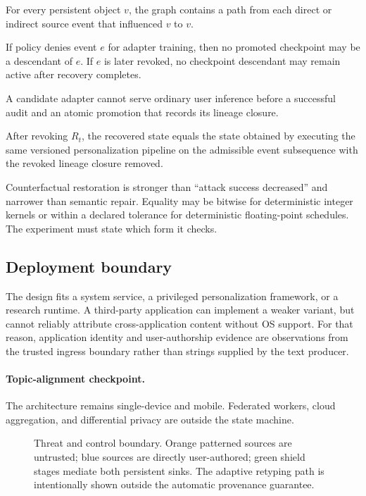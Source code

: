 \begin{definition}
For every persistent object $v$, the graph contains a path from each direct or indirect source event that influenced $v$ to $v$.
\end{definition}

\begin{definition}
If policy denies event $e$ for adapter training, then no promoted checkpoint may be a descendant of $e$. If $e$ is later revoked, no checkpoint descendant may remain active after recovery completes.
\end{definition}

\begin{definition}
A candidate adapter cannot serve ordinary user inference before a successful audit and an atomic promotion that records its lineage closure.
\end{definition}

\begin{definition}
After revoking $R_t$, the recovered state equals the state obtained by executing the same versioned personalization pipeline on the admissible event subsequence with the revoked lineage closure removed.
\end{definition}

Counterfactual restoration is stronger than ``attack success decreased'' and narrower than semantic repair. Equality may be bitwise for deterministic integer kernels or within a declared tolerance for deterministic floating-point schedules. The experiment must state which form it checks.

\subsection{Deployment boundary}

The design fits a system service, a privileged personalization framework, or a research runtime. A third-party application can implement a weaker variant, but cannot reliably attribute cross-application content without OS support. For that reason, application identity and user-authorship evidence are observations from the trusted ingress boundary rather than strings supplied by the text producer.

\paragraph{Topic-alignment checkpoint.} The architecture remains single-device and mobile. Federated workers, cloud aggregation, and differential privacy are outside the state machine.

\begin{figure}[t]
  \centering
  \resizebox{0.95\columnwidth}{!}{}
  \caption{Threat and control boundary. Orange patterned sources are untrusted; blue sources are directly user-authored; green shield stages mediate both persistent sinks. The adaptive retyping path is intentionally shown outside the automatic provenance guarantee.}
  \label{fig:threat}
\end{figure}
